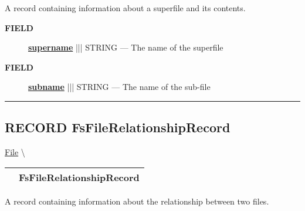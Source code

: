 \par





A record containing information about a superfile and its contents.







\par
\begin{description}
\item [\colorbox{tagtype}{\color{white} \textbf{\textsf{FIELD}}}] \textbf{\underline{supername}} ||| STRING --- The name of the superfile
\item [\colorbox{tagtype}{\color{white} \textbf{\textsf{FIELD}}}] \textbf{\underline{subname}} ||| STRING --- The name of the sub-file
\end{description}





\rule{\linewidth}{0.5pt}
\subsection*{\textsf{\colorbox{headtoc}{\color{white} RECORD}
FsFileRelationshipRecord}}

\hypertarget{ecldoc:file.fsfilerelationshiprecord}{}
\hspace{0pt} \hyperlink{ecldoc:File}{File} \textbackslash 

{\renewcommand{\arraystretch}{1.5}
\begin{tabularx}{\textwidth}{|>{\raggedright\arraybackslash}l|X|}
\hline
\hspace{0pt}\mytexttt{\color{red} } & \textbf{FsFileRelationshipRecord} \\
\hline
\end{tabularx}
}

\par





A record containing information about the relationship between two files.







